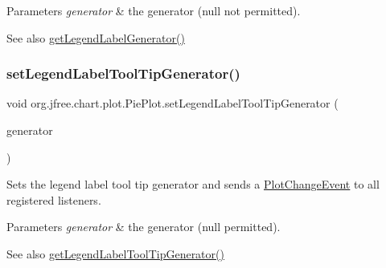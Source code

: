 \begin{DoxyParams}{Parameters}
{\em generator} & the generator ({\ttfamily null} not permitted).\\
\hline
\end{DoxyParams}
\begin{DoxySeeAlso}{See also}
\mbox{\hyperlink{classorg_1_1jfree_1_1chart_1_1plot_1_1_pie_plot_a9045ce4cc30829ab6e83633a0c232299}{get\+Legend\+Label\+Generator()}} 
\end{DoxySeeAlso}
\mbox{\label{classorg_1_1jfree_1_1chart_1_1plot_1_1_pie_plot_a2d4dcbf8f9fa0f63dac3a75d37b38fc5}} 
\subsubsection{\texorpdfstring{set\+Legend\+Label\+Tool\+Tip\+Generator()}{setLegendLabelToolTipGenerator()}}
{\footnotesize\ttfamily void org.\+jfree.\+chart.\+plot.\+Pie\+Plot.\+set\+Legend\+Label\+Tool\+Tip\+Generator (\begin{DoxyParamCaption}\item[{\mbox{\hyperlink{interfaceorg_1_1jfree_1_1chart_1_1labels_1_1_pie_section_label_generator}{Pie\+Section\+Label\+Generator}}}]{generator }\end{DoxyParamCaption})}

Sets the legend label tool tip generator and sends a \mbox{\hyperlink{}{Plot\+Change\+Event}} to all registered listeners.


\begin{DoxyParams}{Parameters}
{\em generator} & the generator ({\ttfamily null} permitted).\\
\hline
\end{DoxyParams}
\begin{DoxySeeAlso}{See also}
\mbox{\hyperlink{classorg_1_1jfree_1_1chart_1_1plot_1_1_pie_plot_a21f044ff1f4be266a6a9cd4d34a549d6}{get\+Legend\+Label\+Tool\+Tip\+Generator()}} 
\end{DoxySeeAlso}
\mbox{\label{classorg_1_1jfree_1_1chart_1_1plot_1_1_pie_plot_a68b18f13f2db07d91dbdbc4b83ea8057}} 
